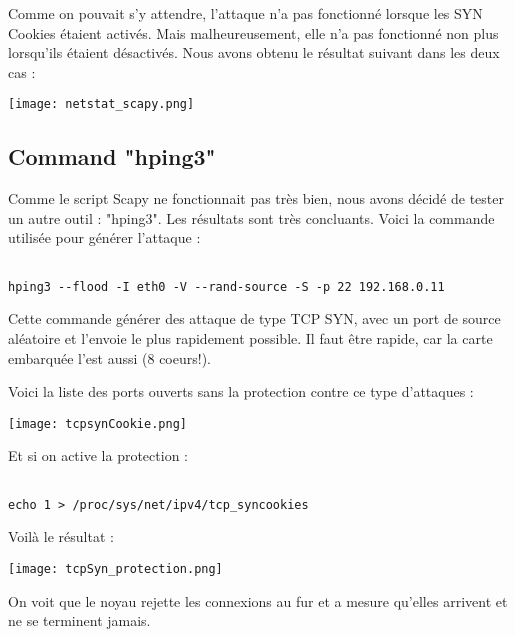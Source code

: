 Comme on pouvait s'y attendre, l'attaque n'a pas fonctionné lorsque les SYN Cookies étaient activés. Mais malheureusement, elle n'a pas fonctionné non plus lorsqu'ils étaient désactivés. Nous avons obtenu le résultat suivant dans les deux cas :

\begin{center} 
\hspace{15cm}
\texttt{[image: netstat\_scapy.png]}
\end{center}
\vspace{0.5cm}


\subsection{Command "hping3"}
Comme le script Scapy ne fonctionnait pas très bien, nous avons décidé de tester un autre outil : "hping3". Les résultats sont très concluants. Voici la commande utilisée pour générer l'attaque :
\begin{lstlisting}[frame=single,style=Console]  % Start your code-block

hping3 --flood -I eth0 -V --rand-source -S -p 22 192.168.0.11
\end{lstlisting}

Cette commande générer des attaque de type TCP SYN, avec un port de source aléatoire et l'envoie le plus rapidement possible. Il faut être rapide, car la carte embarquée l'est aussi (8 coeurs!).

Voici la liste des ports ouverts sans la protection contre ce type d'attaques :
\begin{center} 
\hspace{15cm}
\texttt{[image: tcpsynCookie.png]}
\end{center}
\vspace{0.5cm}

\pagebreak
Et si on active la protection : 
\begin{lstlisting}[frame=single,style=Console]  % Start your code-block

echo 1 > /proc/sys/net/ipv4/tcp_syncookies
\end{lstlisting}

Voilà le résultat :
\begin{center} 
\hspace{15cm}
\texttt{[image: tcpSyn\_protection.png]}
\end{center}
\vspace{0.5cm}

On voit que le noyau rejette les connexions au fur et a mesure qu'elles arrivent et ne se terminent jamais.


